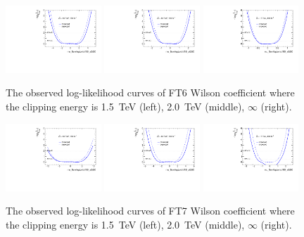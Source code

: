 \begin{figure}[ht]
    \centering
    \includegraphics[width=0.32\textwidth]{figures/aQGC/profileFT61500}
    	\includegraphics[width=0.32\textwidth]{figures/aQGC/profileFT62000}
        \includegraphics[width=0.32\textwidth]{figures/aQGC/profileFT6inf}
        \caption{The observed log-likelihood curves of FT6 Wilson coefficient where the clipping energy is 1.5~TeV (left), 2.0~TeV (middle), $\infty$ (right).}
        \label{fig:ProfileLLFT6}
\end{figure}
\begin{figure}[ht]
    \centering
    \includegraphics[width=0.32\textwidth]{figures/aQGC/profileFT71500}
    	\includegraphics[width=0.32\textwidth]{figures/aQGC/profileFT72000}
        \includegraphics[width=0.32\textwidth]{figures/aQGC/profileFT7inf}
        \caption{The observed log-likelihood curves of FT7 Wilson coefficient where the clipping energy is 1.5~TeV (left), 2.0~TeV (middle), $\infty$ (right).}
        \label{fig:ProfileLLFT7}
\end{figure}

